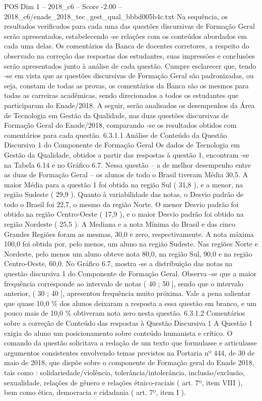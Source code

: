\begin{textsample}{POS Dim 1 – 2018\_c6 – Score -2.00 – 2018\_c6/enade\_2018\_tec\_gest\_qual\_bbbd005b4c.txt}
Na sequência, os resultados verificados para cada uma das questões discursivas de Formação Geral serão apresentados, estabelecendo -se relações com os conteúdos abordados em cada uma delas.
Os comentários da Banca de docentes corretores, a respeito do observado na correção das respostas dos estudantes, suas impressões e conclusões serão apresentados junto à análise de cada questão.
Cumpre esclarecer que, tendo -se em vista que as questões discursivas de Formação Geral são padronizadas, ou seja, constam de todas as provas, os comentários da Banca são os mesmos para todas as carreiras acadêmicas, sendo direcionados a todos os estudantes que participaram do Enade/2018.
A seguir, serão analisados os desempenhos da Área de Tecnologia em Gestão da Qualidade, nas duas questões discursivas de Formação Geral do Enade/2018, comparando -se os resultados obtidos com comentários para cada questão. 6.3.1.1 Análise de Conteúdo da Questão Discursiva 1 do Componente de Formação Geral Os dados de Tecnologia em Gestão da Qualidade, obtidos a partir das respostas à questão 1, encontram -se na Tabela 6.14 e no Gráfico 6.7.
Nessa questão – a de melhor desempenho entre as duas de Formação Geral – os alunos de todo o Brasil tiveram Média 30,5.
A maior Média para a questão 1 foi obtida na região Sul ( 31,8 ), e a menor, na região Sudeste ( 29,9 ).
Quanto à variabilidade das notas, o Desvio padrão de todo o Brasil foi 22,7, o mesmo da região Norte.
O menor Desvio padrão foi obtido na região Centro-Oeste ( 17,9 ), e o maior Desvio padrão foi obtido na região Nordeste ( 25,5 ).
A Mediana e a nota Mínima do Brasil e das cinco Grandes Regiões foram as mesmas, 30,0 e zero, respectivamente.
A nota máxima 100,0 foi obtida por, pelo menos, um aluno na região Sudeste.
Nas regiões Norte e Nordeste, pelo menos um aluno obteve nota 80,0, na região Sul, 90,0 e na região Centro-Oeste, 60,0.
No Gráfico 6.7, mostra -se a distribuição das notas na questão discursiva 1 do Componente de Formação Geral.
Observa -se que a maior frequência corresponde ao intervalo de notas ( 40 ; 50 ], sendo que o intervalo anterior, ( 30 ; 40 ], apresentou frequência muito próxima.
Vale a pena salientar que quase 10,0 \% dos alunos deixaram a resposta a essa questão em branco, e um pouco mais de 10,0 \% obtiveram nota zero nesta questão. 6.3.1.2 Comentários sobre a correção de Conteúdo das respostas à Questão Discursiva 1 A Questão 1 exigia do aluno um posicionamento sobre conteúdo humanista e crítico.
O comando da questão solicitava a redação de um texto que formulasse e articulasse argumentos consistentes envolvendo temas previstos na Portaria nº 444, de 30 de maio de 2018, que dispõe sobre o componente de Formação geral do Enade 2018, tais como : solidariedade/violência, tolerância/intolerância, inclusão/exclusão, sexualidade, relações de gênero e relações étnico-raciais ( art. 7º, item VIII ), bem como ética, democracia e cidadania ( art. 7º, item I ).

\end{textsample}

